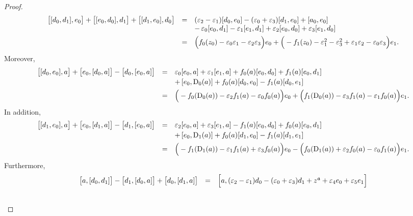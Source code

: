 \documentclass[final,1p,times,nopreprintline]{elsarticle}
\theoremstyle{definition}
\numberwithin{equation}{section}
\newcommand{\ai}{\mathfrak{a}}
\numberwithin{equation}{section}
\newcommand{\D}{\operatorname{D}}
\begin{document}
\begin{proof}
\begin{equation*}
\begin{array}{r c l}
\big[[d_0,d_1],e_0\big]+\big[[e_0,d_0],d_1\big]+\big[[d_1,e_0],d_0\big]&=&(\varepsilon_2-\varepsilon_1)[d_0,e_0]-(\varepsilon_0+\varepsilon_3)[d_1,e_0]+[a_0,e_0]\\\vspace{1.5mm}
		&&-\,\varepsilon_0[e_0,d_1]-\varepsilon_1[e_1,d_1]+\varepsilon_2[e_0,d_0]+\varepsilon_3[e_1,d_0]\\
		&=&\Big(f_0(z_0)-\varepsilon_0\varepsilon_1-\varepsilon_2\varepsilon_3\Big)e_0+\Big(-f_1(z_0)-\varepsilon_1^2-\varepsilon_3^2+\varepsilon_1\varepsilon_2-\varepsilon_0\varepsilon_3\Big)e_1.
	\end{array}
\end{equation*}
	Moreover,
	\begin{equation*}
		\begin{array}{r c l}\vspace{0.75mm}
\big[[d_0,e_0],a\big]+\big[e_0,[d_0,a]\big]-\big[d_0,[e_0,a]\big]&=&\varepsilon_0[e_0,a]+\varepsilon_1[e_1,a]+f_0(a)[e_0,d_0]+f_1(a)[e_0,d_1]\\\vspace{1.5mm}
		&&+\,[e_0,\D_0(a)]+f_0(a)[d_0,e_0]-f_1(a)[d_0,e_1]\\
		&=&\Big(-f_0(\D_0(a))-\varepsilon_2f_1(a)-\varepsilon_0f_0(a)\Big)e_0+\Big(f_1(\D_0(a))-\varepsilon_3f_1(a)-\varepsilon_1f_0(a)\Big)e_1.
	\end{array}
\end{equation*}
	In addition,
	\begin{equation*}
		\begin{array}{r c l}\vspace{0.75mm}
\big[[d_1,e_0],a\big]+\big[e_0,[d_1,a]\big]-\big[d_1,[e_0,a]\big]&=&\varepsilon_2[e_0,a]+\varepsilon_3[e_1,a]-f_1(a)[e_0,d_0]+f_0(a)[e_0,d_1]\\\vspace{1.5mm}
	&&+\,[e_0,\D_1(a)]+f_0(a)[d_1,e_0]-f_1(a)[d_1,e_1]\\
		&=&\Big(-f_1(\D_1(a))-\varepsilon_1f_1(a)+\varepsilon_3f_0(a)\Big)e_0-\Big(f_0(\D_1(a))+\varepsilon_2f_0(a)-\varepsilon_0f_1(a)\Big)e_1.
	\end{array}
\end{equation*}
	Furthermore,
	\begin{equation*}
		\begin{array}{r c l}\vspace{0.75mm}
\big[a,[d_0,d_1]\big]-\big[d_1,[d_0,a]\big]+\big[d_0,[d_1,a]\big]&=&\Big[a,(\varepsilon_2-\varepsilon_1)d_0-(\varepsilon_0+\varepsilon_3)d_1+z^\ai+\varepsilon_4e_0+\varepsilon_5e_1\Big]\\\vspace{0.75mm}

\end{array}
\end{equation*}
\end{proof}
\end{document}
